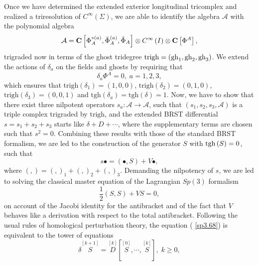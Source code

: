 \documentclass[a4paper,12pt]{article}
\begin{document}
Once we have determined the extended exterior longitudinal tricomplex and
realized a triresolution of $C^{\infty }\left( \Sigma \right) $, we are able
to identify the algebra $\mathcal{A}$ with the polynomial algebra 
\begin{equation}
\mathcal{A}=\mathbf{C}\left[ \Phi _{A}^{*(a)},\bar{\Phi}_{A}^{(a)},\tilde{%
\Phi}_{A}\right] \otimes C^{\infty }\left( I\right) \otimes \mathbf{C}\left[
\Phi ^{A}\right] ,  \label{sp3.66}
\end{equation}
trigraded now in terms of the ghost tridegree $\mathrm{trigh}=\left( \mathrm{%
gh}_{1},\mathrm{gh}_{2},\mathrm{gh}_{3}\right) $. We extend the actions of $%
\delta _{a}$ on the fields and ghosts by requiring that 
\begin{equation}
\delta _{a}\Phi ^{A}=0,\;a=1,2,3,  \label{sp3.66a}
\end{equation}
which ensures that $\mathrm{trigh}\left( \delta _{1}\right) =\left(
1,0,0\right) $, $\mathrm{trigh}\left( \delta _{2}\right) =\left(
0,1,0\right) $, $\mathrm{trigh}\left( \delta _{3}\right) =\left(
0,0,1\right) $ and $\mathrm{tgh}\left( \delta _{a}\right) =\mathrm{tgh}%
\left( \delta \right) =1$. Now, we have to show that there exist three
nilpotent operators $s_{a}:\mathcal{A}\rightarrow \mathcal{A}$, such that $%
\left( s_{1},s_{2},s_{3},\mathcal{A}\right) $ is a triple complex trigraded
by $\mathrm{trigh}$, and the extended BRST differential $s=s_{1}+s_{2}+s_{3}$
starts like $\delta +D+\cdots $, where the supplementary terms are chosen
such that $s^{2}=0$. Combining these results with those of the standard BRST
formalism, we are led to the construction of the generator $S$ with $\mathrm{%
tgh}\left( S\right) =0$, such that 
\begin{equation}
s\bullet =\left( \bullet ,S\right) +V\bullet ,  \label{sp3.67}
\end{equation}
where $\left( ,\right) =\left( ,\right) _{1}+\left( ,\right) _{2}+\left(
,\right) _{3}$. Demanding the nilpotency of $s$, we are led to solving the
classical master equation of the Lagrangian $Sp(3)$ formalism 
\begin{equation}
\frac{1}{2}\left( S,S\right) +VS=0,  \label{sp3.68}
\end{equation}
on account of the Jacobi identity for the antibracket and of the fact that $%
V $ behaves like a derivation with respect to the total antibracket.
Following the usual rules of homological perturbation theory, the equation (%
\ref{sp3.68}) is equivalent to the tower of equations 
\begin{equation}
\delta \stackrel{[k+1]}{S}=\stackrel{[k]}{D}\left[ \stackrel{[0]}{S},\cdots ,%
\stackrel{[k]}{S}\right] ,\;k\geq 0,  \label{sp3.69}
\end{equation}
\end{document}
